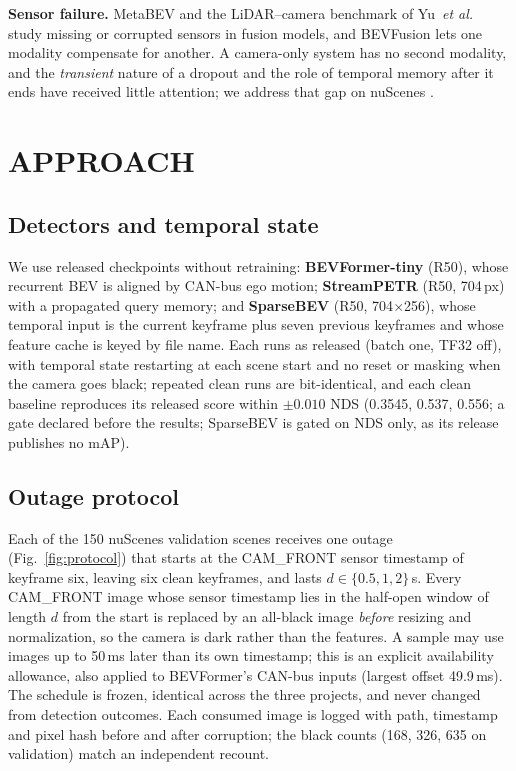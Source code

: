 \documentclass[letterpaper, 10 pt, conference]{ieeeconf}
\begin{document}
\textbf{Sensor failure.} MetaBEV \cite{ge2023} and the LiDAR--camera benchmark of Yu~\emph{et al.}~\cite{yu2023} study missing or corrupted sensors in fusion models,
and BEVFusion \cite{bevfusion} lets one modality compensate for another. A camera-only system has no second modality, and the \emph{transient} nature of a dropout and the role of temporal memory after it ends have received little attention; we address that gap on nuScenes \cite{nuscenes}.

\section{APPROACH}

\subsection{Detectors and temporal state}
We use released checkpoints without retraining: \textbf{BEVFormer-tiny} (R50), whose recurrent BEV is aligned by CAN-bus ego motion;
\textbf{StreamPETR} (R50, 704\,px) with a propagated query memory; and \textbf{SparseBEV} (R50, 704$\times$256), whose temporal input is the current keyframe plus
seven previous keyframes and whose feature cache is keyed by file name. Each runs as released (batch one, TF32 off), with temporal state restarting at each scene start and no reset or masking when the camera goes black; repeated clean runs are
bit-identical, and each clean baseline reproduces its released score within $\pm 0.010$ NDS (0.3545, 0.537, 0.556; a gate declared before the results; SparseBEV is gated on NDS
only, as its release publishes no mAP).

\subsection{Outage protocol}
Each of the 150 nuScenes validation scenes receives one outage (Fig.~\ref{fig:protocol}) that starts at the CAM\_FRONT sensor timestamp of keyframe six, leaving six clean keyframes,
and lasts $d\in\{0.5,1,2\}$\,s. Every CAM\_FRONT image whose sensor timestamp lies in the half-open window of length $d$ from the start is replaced by an all-black image
\emph{before} resizing and normalization, so the camera is dark rather than the features. A sample may use images up to 50\,ms later than its own timestamp; this is an explicit availability allowance, also applied to BEVFormer's CAN-bus inputs (largest offset 49.9\,ms). The schedule is frozen,
identical across the three projects, and never changed from detection outcomes. Each consumed image is logged with path, timestamp and pixel hash before and after corruption; the black counts
(168, 326, 635 on validation) match an independent recount.
\end{document}
